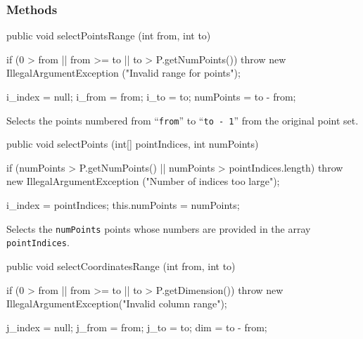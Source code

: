 \subsubsection*{Methods}
\begin{code}

   public void selectPointsRange (int from, int to) \begin{hide} {
      if (0 > from || from >= to || to > P.getNumPoints())
         throw new IllegalArgumentException ("Invalid range for points");

      i_index = null;
      i_from = from;
      i_to = to;
      numPoints = to - from;
   }\end{hide}
\end{code}
 \begin{tabb}
   Selects the points numbered from ``\texttt{from}'' to ``\texttt{to - 1}'' from the
   original point set.
 \end{tabb}
\begin{htmlonly}
\end{htmlonly}
\begin{code}

   public void selectPoints (int[] pointIndices, int numPoints) \begin{hide} {
      if (numPoints > P.getNumPoints() || numPoints > pointIndices.length)
         throw new IllegalArgumentException ("Number of indices too large");

      i_index = pointIndices;
      this.numPoints = numPoints;
   }\end{hide}
\end{code}
 \begin{tabb}
   Selects the \texttt{numPoints} points whose numbers are provided in the array
   \texttt{pointIndices}.
 \end{tabb}
\begin{htmlonly}
\end{htmlonly}
\begin{code}

   public void selectCoordinatesRange (int from, int to) \begin{hide} {
      if (0 > from || from >= to || to > P.getDimension())
         throw new IllegalArgumentException("Invalid column range");

      j_index = null;
      j_from = from;
      j_to = to;
      dim = to - from;
   }\end{hide}
\end{code}
